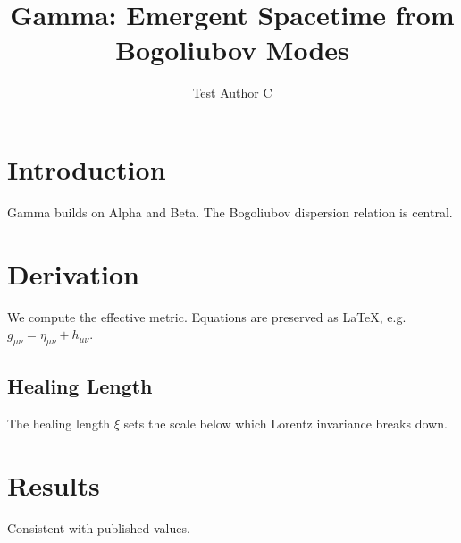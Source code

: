 \documentclass{article}
\title{Gamma: Emergent Spacetime from Bogoliubov Modes}
\author{Test Author C}
\begin{document}
\maketitle

\section{Introduction}
Gamma builds on Alpha and Beta. The Bogoliubov dispersion relation is central.

\section{Derivation}
We compute the effective metric. Equations are preserved as LaTeX, e.g.
$g_{\mu\nu} = \eta_{\mu\nu} + h_{\mu\nu}$.

\subsection{Healing Length}
The healing length $\xi$ sets the scale below which Lorentz invariance breaks down.

\section{Results}
Consistent with published values.
\end{document}

